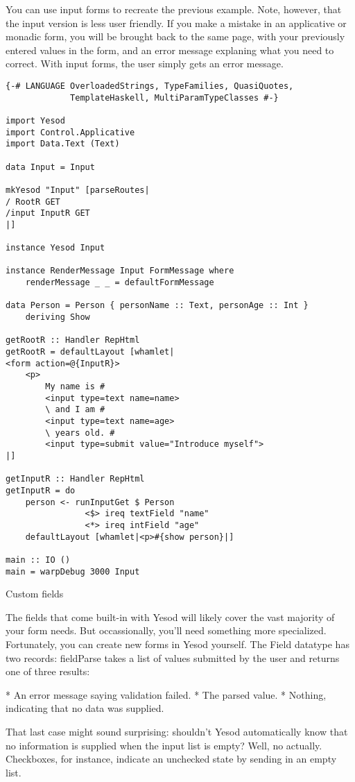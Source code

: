 You can use input forms to recreate the previous example. Note, however, that the input version is less user friendly. If you make a mistake in an applicative or monadic form, you will be brought back to the same page, with your previously entered values in the form, and an error message explaning what you need to correct. With input forms, the user simply gets an error message.

\begin{lstlisting}
{-# LANGUAGE OverloadedStrings, TypeFamilies, QuasiQuotes,
             TemplateHaskell, MultiParamTypeClasses #-}

import Yesod
import Control.Applicative
import Data.Text (Text)

data Input = Input

mkYesod "Input" [parseRoutes|
/ RootR GET
/input InputR GET
|]

instance Yesod Input

instance RenderMessage Input FormMessage where
    renderMessage _ _ = defaultFormMessage

data Person = Person { personName :: Text, personAge :: Int }
    deriving Show

getRootR :: Handler RepHtml
getRootR = defaultLayout [whamlet|
<form action=@{InputR}>
    <p>
        My name is #
        <input type=text name=name>
        \ and I am #
        <input type=text name=age>
        \ years old. #
        <input type=submit value="Introduce myself">
|]

getInputR :: Handler RepHtml
getInputR = do
    person <- runInputGet $ Person
                <$> ireq textField "name"
                <*> ireq intField "age"
    defaultLayout [whamlet|<p>#{show person}|]

main :: IO ()
main = warpDebug 3000 Input
\end{lstlisting}

Custom fields

The fields that come built-in with Yesod will likely cover the vast majority of your form needs. But occassionally, you'll need something more specialized. Fortunately, you can create new forms in Yesod yourself. The Field datatype has two records: fieldParse takes a list of values submitted by the user and returns one of three results:

* An error message saying validation failed.
* The parsed value.
* Nothing, indicating that no data was supplied.

That last case might sound surprising: shouldn't Yesod automatically know that no information is supplied when the input list is empty? Well, no actually. Checkboxes, for instance, indicate an unchecked state by sending in an empty list.

